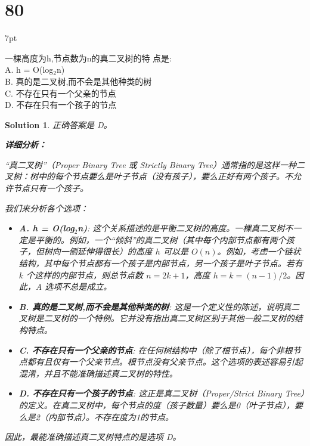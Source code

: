 \documentclass[UTF8]{report}
\newtheorem{solution}{Solution}
\theoremstyle{MyLineTheoremStyle} %
\theoremstyle{MyBlockTheoremStyle} %
\theoremstyle{MySubsubsectionStyle} %
\newenvironment{graybox}{%
        \def\FrameCommand{%
        \hspace{1pt}%
        {\color{gray}\small \vrule width 2pt}%
        {\color{graybox_color}\vrule width 4pt}%
        \colorbox{graybox_color}%
        }%
        \MakeFramed{\advance\hsize-\width\FrameRestore}%
        \noindent\hspace{-4.55pt}%
        \begin{adjustwidth}{}{7pt}%
        \vspace{2pt}\vspace{2pt}%
        }
        {%
        \vspace{2pt}\end{adjustwidth}\endMakeFramed%
        }
\begin{document}
\section*{80}
\begin{graybox}
一棵高度为h,节点数为n的真二叉树的特
点是: \\
A. h = O(log$_2$n) \\
B. 真的是二叉树,而不会是其他种类的树 \\
C. 不存在只有一个父亲的节点 \\
D. 不存在只有一个孩子的节点
\end{graybox}

\begin{solution}
正确答案是 D。

\textbf{详细分析：}

“真二叉树”（Proper Binary Tree 或 Strictly Binary Tree）通常指的是这样一种二叉树：树中的每个节点要么是叶子节点（没有孩子），要么正好有两个孩子。不允许节点只有一个孩子。

我们来分析各个选项：
\begin{itemize}
    \item \textbf{A. h = O(log$_2$n)}:
        这个关系描述的是平衡二叉树的高度。一棵真二叉树不一定是平衡的。例如，一个“倾斜”的真二叉树（其中每个内部节点都有两个孩子，但树向一侧延伸得很长）的高度 $h$ 可以是 $O(n)$。例如，考虑一个链状结构，其中每个节点都有一个孩子是内部节点，另一个孩子是叶子节点。若有 $k$ 个这样的内部节点，则总节点数 $n = 2k+1$，高度 $h=k=(n-1)/2$。因此，A 选项不总是成立。

    \item \textbf{B. 真的是二叉树,而不会是其他种类的树}:
        这是一个定义性的陈述，说明真二叉树是二叉树的一个特例。它并没有指出真二叉树区别于其他一般二叉树的结构特点。

    \item \textbf{C. 不存在只有一个父亲的节点}:
        在任何树结构中（除了根节点），每个非根节点都有且仅有一个父亲节点。根节点没有父亲节点。这个选项的表述容易引起混淆，并且不能准确描述真二叉树的特性。

    \item \textbf{D. 不存在只有一个孩子的节点}:
        这正是真二叉树（Proper/Strict Binary Tree）的定义。在真二叉树中，每个节点的度（孩子数量）要么是0（叶子节点），要么是2（内部节点）。不存在度为1的节点。
\end{itemize}

因此，最能准确描述真二叉树特点的是选项 D。
\end{solution}
\end{document}
